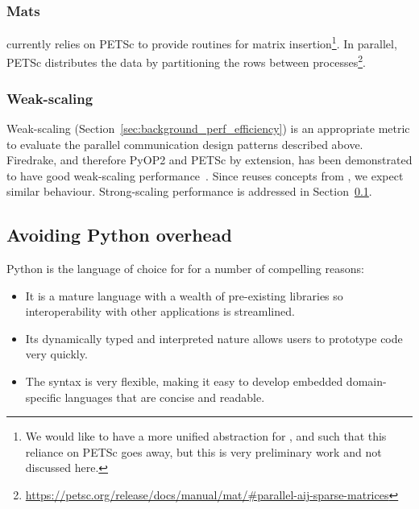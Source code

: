 \subsubsection{Mats}
\label{sec:impl_parallel_matrices}

 currently relies on PETSc to provide routines for matrix insertion\footnote{We would like to have a more unified abstraction for ,  and  such that this reliance on PETSc goes away, but this is very preliminary work and not discussed here.}.
In parallel, PETSc distributes the data by partitioning the rows between processes\footnote{\url{https://petsc.org/release/docs/manual/mat/\#parallel-aij-sparse-matrices}}.

\subsubsection{Weak-scaling}

Weak-scaling (Section~\ref{sec:background_perf_efficiency}) is an appropriate metric to evaluate the parallel communication design patterns described above.
Firedrake, and therefore PyOP2 and PETSc by extension, has been demonstrated to have good weak-scaling performance~\cite{rathgeberFiredrakeAutomatingFinite2016}.
Since  reuses concepts from , we expect similar behaviour.
Strong-scaling performance is addressed in Section~\ref{sec:impl_overhead}.

\subsection{Avoiding Python overhead}
\label{sec:impl_overhead}

Python is the language of choice for  for a number of compelling reasons:

\begin{itemize}
  \item It is a mature language with a wealth of pre-existing libraries so interoperability with other applications is streamlined.
    \item Its dynamically typed and interpreted nature allows users to prototype code very quickly.
    \item The syntax is very flexible, making it easy to develop embedded domain-specific languages that are concise and readable.
\end{itemize}

